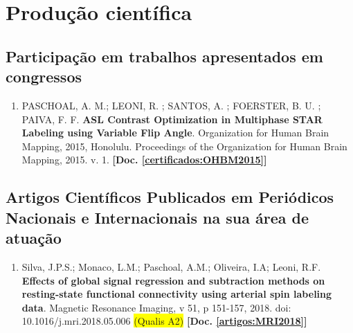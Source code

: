 \documentclass[a4paper,oneside,10pt]{article}
\begin{document}
\newpage
\section{Produção científica}
\subsection{Participação em trabalhos apresentados em congressos} %
\vspace{0.3cm}

\begin{enumerate}
\renewcommand{\labelenumi}{{\large\bfseries\arabic{enumi}.}}

\item 	PASCHOAL, A. M.; LEONI, R. ; SANTOS, A. ; FOERSTER, B. U. ; PAIVA, F. F.  \textbf{ASL Contrast Optimization in Multiphase STAR Labeling using Variable Flip Angle}. Organization for Human Brain Mapping, 2015, Honolulu. Proceedings of the Organization for Human Brain Mapping, 2015. v. 1. \textbf{[Doc. \ref{certificados:OHBM2015}]}

\end{enumerate}

\subsection{Artigos Científicos Publicados em Periódicos Nacionais e Internacionais na sua área de atuação}
\vspace{0.3cm}

\begin{enumerate}
        \renewcommand{\labelenumi}{{\large\bfseries\arabic{enumi}.}} %
        
        \item Silva, J.P.S.; Monaco, L.M.; Paschoal, A.M.; Oliveira, I.A; Leoni, R.F. \textbf{Effects of global signal regression and subtraction methods on resting-state functional connectivity using arterial spin labeling data}. Magnetic Resonance Imaging, v 51, p 151-157, 2018. doi: 10.1016/j.mri.2018.05.006 \colorbox{yellow}{(Qualis A2)} \textbf{[Doc. \ref{artigos:MRI2018}]}

\end{enumerate}
\end{document}
